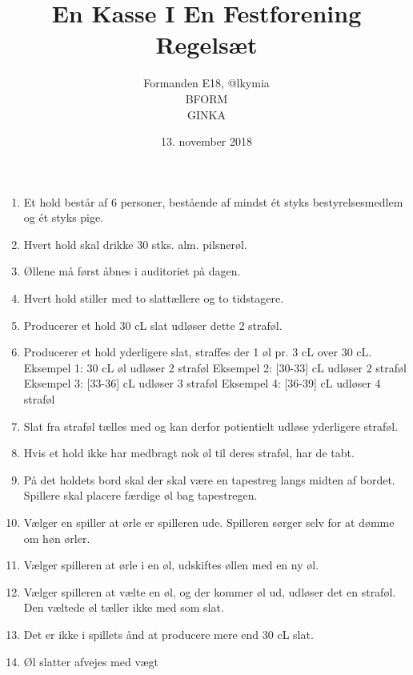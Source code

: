 \documentclass[a4paper, 12pt]{article}
\title{
    En Kasse I En Festforening\\
    Regelsæt
}
\author{
    Formanden E18, @lkymia\\
    BFORM\\
    GINKA\\
}
\date{13. november 2018}
\begin{document}
\maketitle
\begin{enumerate}
 \item Et hold består af 6 personer, bestående af mindst ét styks bestyrelsesmedlem og ét styks pige.
 \item Hvert hold skal drikke 30 stks. alm. pilsnerøl.
 \item Øllene må først åbnes i auditoriet på dagen.
 \item Hvert hold stiller med to slattællere og to tidstagere.
 \item Producerer et hold 30 cL slat udløser dette 2 straføl.
 \item Producerer et hold yderligere slat, straffes der 1 øl pr. 3 cL over 30 cL.
	 \subitem Eksempel 1: 30 cL øl udløser 2 straføl
	 \subitem Eksempel 2: [30-33] cL udløser 2 straføl
	 \subitem Eksempel 3: [33-36] cL udløser 3 straføl
	 \subitem Eksempel 4: [36-39] cL udløser 4 straføl
 \item Slat fra straføl tælles med og kan derfor potientielt udløse yderligere straføl.
 \item Hvis et hold ikke har medbragt nok øl til deres straføl, har de tabt.
 \item På det holdets bord skal der skal være en tapestreg langs midten af bordet. Spillere skal placere færdige øl bag tapestregen.
 \item Vælger en spiller at ørle er spilleren ude. Spilleren sørger selv for at dømme om høn ørler.
 \item Vælger spilleren at ørle i en øl, udskiftes øllen med en ny øl.
 \item Vælger spilleren at vælte en øl, og der kommer øl ud, udløser det en straføl. Den væltede øl tæller ikke med som slat.
 \item Det er ikke i spillets ånd at producere mere end 30 cL slat.
 \item Øl slatter afvejes med vægt
\end{enumerate}
\end{document}
